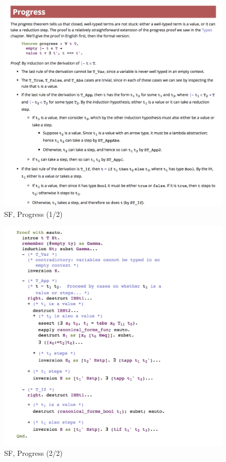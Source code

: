 \documentclass[runningheads]{llncs}
\begin{document}
\begin{figure}[t]
  \includegraphics[width=\textwidth]{figures/sf-progress-1.png}
  \caption{SF, Progress (1/2)}
  \label{fig:sf-progress-1}
\end{figure}  

\begin{figure}[t]
  \includegraphics[width=\textwidth]{figures/sf-progress-2.png}
  \caption{SF, Progress (2/2)}
  \label{fig:sf-progress-2}
\end{figure}  
\end{document}
